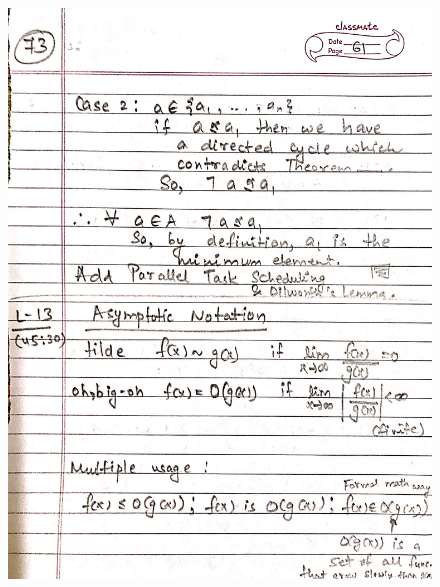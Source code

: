 \begin{figure}[H]
    \centering
    \includegraphics[scale=0.25]{"./MIT-6.042J/MIT-6042J-073"}
\end{figure}
\newpage
